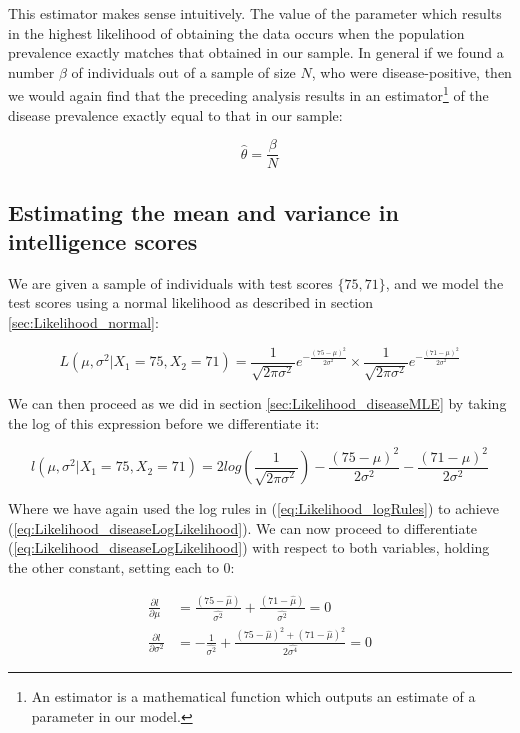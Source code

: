 \documentclass[11pt,fullpage]{book}
\begin{document}
This estimator makes sense intuitively. The value of the parameter which results in the highest likelihood of obtaining the data occurs when the population prevalence exactly matches that obtained in our sample. In general if we found a number $\beta$ of individuals out of a sample of size $N$, who were disease-positive, then we would again find that the preceding analysis results in an estimator\footnote{An estimator is a mathematical function which outputs an estimate of a parameter in our model.} of the disease prevalence exactly equal to that in our sample:

\begin{equation}\label{eq:Likelihood_binomialestimator}
\hat{\theta} = \frac{\beta}{N}
\end{equation}

\subsection{Estimating the mean and variance in intelligence scores}
We are given a sample of individuals with test scores $\{75,71\}$, and we model the test scores using a normal likelihood as described in section \ref{sec:Likelihood_normal}:

\begin{equation}\label{eq:Likelihood_normalTwo}
L(\mu,\sigma^2|X_1=75,X_2 =71) = \frac{1}{\sqrt{2\pi\sigma^2}}e^{-\frac{(75-\mu)^2}{2\sigma^2}}\times \frac{1}{\sqrt{2\pi\sigma^2}}e^{-\frac{(71-\mu)^2}{2\sigma^2}}
\end{equation}

We can then proceed as we did in section \ref{sec:Likelihood_diseaseMLE} by taking the log of this expression before we differentiate it:

\begin{equation}\label{eq:Likelihood_diseaseLogLikelihood}
l(\mu,\sigma^2|X_1=75,X_2 =71) = 2log\left(\frac{1}{\sqrt{2\pi\sigma^2}}\right)-{\frac{(75-\mu)^2}{2\sigma^2}}-{\frac{(71-\mu)^2}{2\sigma^2}}
\end{equation}

Where we have again used the log rules in (\ref{eq:Likelihood_logRules}) to achieve (\ref{eq:Likelihood_diseaseLogLikelihood}). We can now proceed to differentiate (\ref{eq:Likelihood_diseaseLogLikelihood}) with respect to both variables, holding the other constant, setting each to 0:

\begin{align}\label{eq:Likelihood_diseaseDerivativeOne}
\frac{\partial l}{\partial \mu} &= {\frac{(75-\hat{\mu})}{\hat{\sigma^2}}}+{\frac{(71-\hat{\mu})}{\hat{\sigma^2}}} = 0\\
\frac{\partial l}{\partial \sigma^2} &= -\frac{1}{\hat{\sigma^2}} + \frac{(75-\hat{\mu})^2+(71-\hat{\mu})^2}{2\hat{\sigma^4}} = 0
\end{align}
\end{document}
